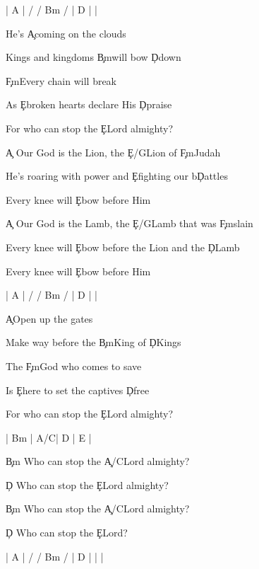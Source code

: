\documentclass[9pt]{extarticle}
\begin{document}
\bsong

\bi[2]
| A |  / / Bm /  | D |  |
\ei

\bv
He's \c{A}coming on the clouds

Kings and kingdoms \c{Bm}will bow \c{D}down

\c{F\s m}Every chain will break

As \c{E}broken hearts declare His \c{D}praise

For who can stop the \c{E}Lord almighty?
\ev

\bc
\c{A} Our God is the Lion, the \c{E/G\s }Lion of \c{F\s m}Judah

He’s roaring with power and \c{E}fighting our b\c{D}attles

Every knee will \c{E}bow before Him

\c{A} Our God is the Lamb, the \c{E/G\s }Lamb that was \c{F\s m}slain


Every knee will \c{E}bow before the Lion and the \c{D}Lamb

Every knee will \c{E}bow before Him
\ec

\bin[2]
| A |  / / Bm /  | D |  |
\ein

\bv
\c{A}Open up the gates

Make way before the \c{Bm}King of \c{D}Kings

The \c{F\s m}God who comes to save

Is \c{E}here to set the captives \c{D}free

For who can stop the \c{E}Lord almighty?
\ev


\bin
| Bm |  A/C\s   | D | E |
\ein

\bb[3]
\c{Bm} Who can stop the \c{A/C\s }Lord almighty?

\c{D} Who can stop the \c{E}Lord almighty?
\eb

\bb
\c{Bm} Who can stop the \c{A/C\s }Lord almighty?

\c{D} Who can stop the \c{E}Lord?
\eb


\bo[2]
| A |  / / Bm /  | D |  |  |
\eo

\esong
\end{document}
